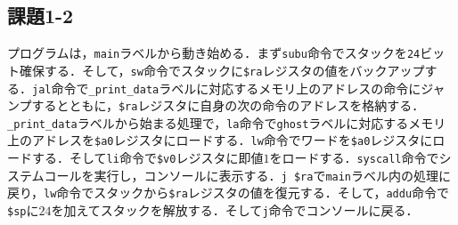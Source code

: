 \subsection{課題1-2}
プログラムは，\verb|main|ラベルから動き始める．まず\verb|subu|命令でスタックを\verb|24|ビット確保する．そして，\verb|sw|命令でスタックに\verb|$ra|レジスタの値をバックアップする．\verb|jal|命令で\verb|_print_data|ラベルに対応するメモリ上のアドレスの命令にジャンプするとともに，\verb|$ra|レジスタに自身の次の命令のアドレスを格納する．\verb|_print_data|ラベルから始まる処理で，\verb|la|命令で\verb|ghost|ラベルに対応するメモリ上のアドレスを\verb|$a0|レジスタにロードする．\verb|lw|命令でワードを\verb|$a0|レジスタにロードする．そして\verb|li|命令で\verb|$v0|レジスタに即値$1$をロードする．\verb|syscall|命令でシステムコールを実行し，コンソールに表示する．\verb|j $ra|で\verb|main|ラベル内の処理に戻り，\verb|lw|命令でスタックから\verb|$ra|レジスタの値を復元する．そして，\verb|addu|命令で\verb|$sp|に$24$を加えてスタックを解放する．そして\verb|j|命令でコンソールに戻る．


